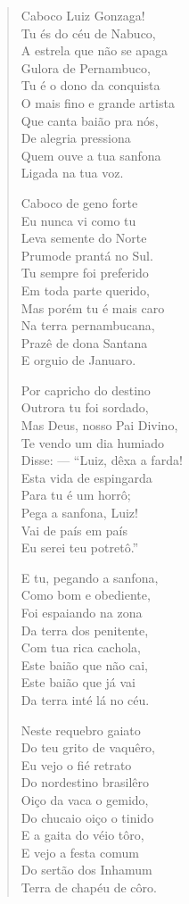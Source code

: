 \begin{verse}
Caboco Luiz Gonzaga!\\
Tu és do céu de Nabuco,\\
A estrela que não se apaga\\
Gulora de Pernambuco,\\
Tu é o dono da conquista\\
O mais fino e grande artista\\
Que canta baião pra nós,\\
De alegria pressiona\\
Quem ouve a tua sanfona\\
Ligada na tua voz.

Caboco de geno forte\\
Eu nunca vi como tu\\
Leva semente do Norte\\
Prumode prantá no Sul.\\
Tu sempre foi preferido\\
Em toda parte querido,\\
Mas porém tu é mais caro\\
Na terra pernambucana,\\
Prazê de dona Santana\\
E orguio de Januaro.

Por capricho do destino\\
Outrora tu foi sordado,\\
Mas Deus, nosso Pai Divino,\\
Te vendo um dia humiado\\
Disse: --- ``Luiz, dêxa a farda!\\
Esta vida de espingarda\\
Para tu é um horrô;\\
Pega a sanfona, Luiz!\\
Vai de país em país\\
Eu serei teu potretô.''

E tu, pegando a sanfona,\\
Como bom e obediente,\\
Foi espaiando na zona\\
Da terra dos penitente,\\
Com tua rica cachola,\\
Este baião que não cai,\\
Este baião que já vai\\
Da terra inté lá no céu.

Neste requebro gaiato\\
Do teu grito de vaquêro,\\
Eu vejo o fié retrato\\
Do nordestino brasilêro\\
Oiço da vaca o gemido,\\
Do chucaio oiço o tinido\\
E a gaita do véio tôro,\\
E vejo a festa comum\\
Do sertão dos Inhamum\\
Terra de chapéu de côro.


\end{verse}
